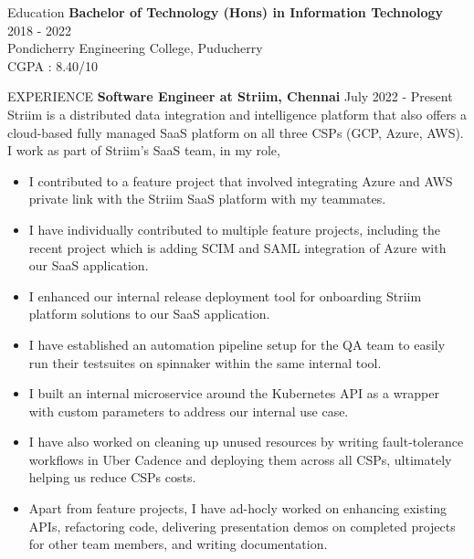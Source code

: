\documentclass{template}
\begin{document}
\begin{rSection}{Education}
{\bf Bachelor of Technology (Hons) in Information Technology} \hfill {2018 - 2022}
\\ 
Pondicherry Engineering College, Puducherry \\
CGPA : 8.40/10


\end{rSection}

\begin{rSection}{EXPERIENCE}
\textbf{Software Engineer at Striim, Chennai} \hfill July 2022 - Present \\
Striim is a distributed data integration and intelligence platform that also offers a cloud-based fully managed SaaS platform on all three CSPs (GCP, Azure, AWS). I work as part of Striim's SaaS team, in my role,

\begin{itemize}
    \item I contributed to a feature project that involved integrating Azure and AWS private link with the Striim SaaS platform with my teammates.

    \item I have individually contributed to multiple feature projects, including the recent project which is adding SCIM and SAML integration of Azure with our SaaS application.

    \item I enhanced our internal release deployment tool for onboarding Striim platform solutions to our SaaS application.

    \item I have established an automation pipeline setup for the QA team to easily run their testsuites on spinnaker within the same internal tool.

    \item I built an internal microservice around the Kubernetes API as a wrapper with custom parameters to address our internal use case.

    \item I have also worked on cleaning up unused resources by writing fault-tolerance workflows in Uber Cadence and deploying them across all CSPs, ultimately helping us reduce CSPs costs.

    \item Apart from feature projects, I have ad-hocly worked on enhancing existing APIs, refactoring code, delivering presentation demos on completed projects for other team members, and writing documentation.
\end{itemize}


\end{rSection}
\end{document}
